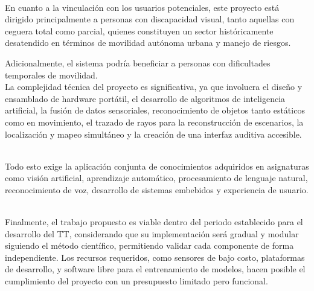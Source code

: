 \\

En cuanto a la vinculación con los usuarios potenciales, este proyecto está dirigido principalmente a personas con discapacidad visual, tanto aquellas con ceguera total como parcial, quienes constituyen un sector históricamente desatendido en términos de movilidad autónoma urbana y manejo de riesgos.

Adicionalmente, el sistema podría beneficiar a personas con dificultades temporales de movilidad.\\

La complejidad técnica del proyecto es significativa, ya que involucra el diseño y ensamblado de hardware portátil, el desarrollo de algoritmos de inteligencia artificial, la fusión de datos sensoriales, reconocimiento de objetos tanto estáticos como en movimiento, el trazado de rayos para la reconstrucción de escenarios, la localización y mapeo simultáneo y la creación de una interfaz auditiva accesible.

\\

Todo esto exige la aplicación conjunta de conocimientos adquiridos en asignaturas como visión artificial, aprendizaje automático, procesamiento de 
lenguaje natural, reconocimiento de voz, desarrollo de sistemas embebidos y experiencia de usuario.

\\

Finalmente, el trabajo propuesto es viable dentro del periodo establecido para el desarrollo del TT, considerando que su implementación será gradual y modular siguiendo el método científico, permitiendo validar cada componente de forma independiente. Los recursos requeridos, como sensores de bajo costo, plataformas de desarrollo, y software libre para el entrenamiento de modelos, hacen posible el cumplimiento del proyecto con un presupuesto limitado pero funcional.